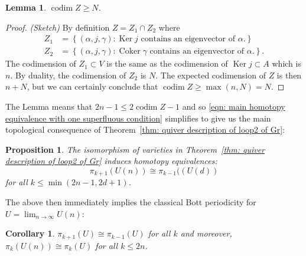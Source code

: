 \documentclass{amsart}
\newtheorem{proposition}[theorem]{Proposition}
\newtheorem{lemma}[theorem]{Lemma}
\newtheorem{corollary}[theorem]{Corollary}
\theoremstyle{definition}
\newcommand{\Ker}{\operatorname{Ker}}
\newcommand{\Coker}{\operatorname{Coker}}
\newcommand{\codim}{\operatorname{codim}}
\begin{document}
\begin{lemma}
$\codim Z \geq N$. 
\end{lemma}
\begin{proof}
\emph{(Sketch)} By definition $Z=Z_{1}\cap Z_{2} $ where
\begin{align*}
Z_{1}&= \left\{(\alpha ,j,\gamma ): \text{$\Ker j$ contains an
eigenvector of $\alpha$}.  \right\}\\
Z_{2}&= \left\{(\alpha ,j,\gamma ): \text{$\Coker \gamma  $ contains an
eigenvector of $\alpha$}.  \right\}.
\end{align*}
The codimension of $Z_{1}\subset V$ is the same as the codimension of
$\Ker j \subset A$ which is $n$. By duality, the codimension of
$Z_{2}$ is $N$. The expected codimension of $Z$ is then $n+N$, but we
can certainly conclude that $\codim Z\geq \max (n,N)=N$.
\end{proof}
The Lemma means that $2n-1\leq 2\codim Z-1$ and so \eqref{eqn: main
homotopy equivalence with one superfluous condition} simplifies to
give us the main topological consequence of Theorem~\ref{thm: quiver
description of loop2 of Gr}: 
\begin{proposition}\label{prop: main homotopy equivalence}
The isomorphism of varieties in Theorem~\ref{thm: quiver description
of loop2 of Gr} induces homotopy equivalences:
\[
\pi_{k+1}(U(n))\cong \pi_{k-1}((U(d))
\]
for all $k\leq \min (2n-1,2d+1)$.
\end{proposition}
The above then immediately implies the classical Bott periodicity for
$U=\lim_{n\to \infty}U(n)$:
\begin{corollary}
$\pi_{k+1}(U)\cong \pi_{k-1}(U)$ for all $k$ and moreover,
$\pi_{k}(U(n))\cong \pi_{k}(U) $ for all $k\leq 2n$.
\end{corollary}








\end{document}
